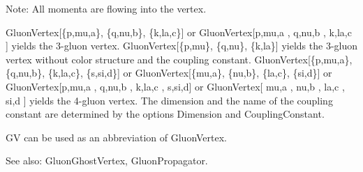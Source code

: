 
Note: All momenta are flowing into the vertex.

GluonVertex[\{p,mu,a\}, \{q,nu,b\}, \{k,la,c\}] or GluonVertex[p,mu,a , q,nu,b , k,la,c ] yields the 3-gluon vertex.
  GluonVertex[\{p,mu\}, \{q,nu\}, \{k,la\}] yields the 3-gluon vertex without color structure and the coupling constant.
  GluonVertex[\{p,mu,a\}, \{q,nu,b\}, \{k,la,c\}, \{s,si,d\}] or GluonVertex[\{mu,a\}, \{nu,b\}, \{la,c\}, \{si,d\}] or
  GluonVertex[p,mu,a , q,nu,b , k,la,c , s,si,d] or GluonVertex[ mu,a , nu,b , la,c , si,d ] yields the 4-gluon vertex. The dimension and
  the name of the coupling constant are determined by the options Dimension and CouplingConstant.

GV can be used as an abbreviation of GluonVertex.





See also:  GluonGhostVertex, GluonPropagator.








